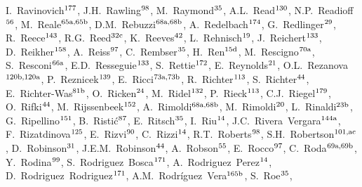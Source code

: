 \begin{flushleft}
I.~Ravinovich$^\textrm{\scriptsize 177}$,    
J.H.~Rawling$^\textrm{\scriptsize 98}$,    
M.~Raymond$^\textrm{\scriptsize 35}$,    
A.L.~Read$^\textrm{\scriptsize 130}$,    
N.P.~Readioff$^\textrm{\scriptsize 56}$,    
M.~Reale$^\textrm{\scriptsize 65a,65b}$,    
D.M.~Rebuzzi$^\textrm{\scriptsize 68a,68b}$,    
A.~Redelbach$^\textrm{\scriptsize 174}$,    
G.~Redlinger$^\textrm{\scriptsize 29}$,    
R.~Reece$^\textrm{\scriptsize 143}$,    
R.G.~Reed$^\textrm{\scriptsize 32c}$,    
K.~Reeves$^\textrm{\scriptsize 42}$,    
L.~Rehnisch$^\textrm{\scriptsize 19}$,    
J.~Reichert$^\textrm{\scriptsize 133}$,    
D.~Reikher$^\textrm{\scriptsize 158}$,    
A.~Reiss$^\textrm{\scriptsize 97}$,    
C.~Rembser$^\textrm{\scriptsize 35}$,    
H.~Ren$^\textrm{\scriptsize 15d}$,    
M.~Rescigno$^\textrm{\scriptsize 70a}$,    
S.~Resconi$^\textrm{\scriptsize 66a}$,    
E.D.~Resseguie$^\textrm{\scriptsize 133}$,    
S.~Rettie$^\textrm{\scriptsize 172}$,    
E.~Reynolds$^\textrm{\scriptsize 21}$,    
O.L.~Rezanova$^\textrm{\scriptsize 120b,120a}$,    
P.~Reznicek$^\textrm{\scriptsize 139}$,    
E.~Ricci$^\textrm{\scriptsize 73a,73b}$,    
R.~Richter$^\textrm{\scriptsize 113}$,    
S.~Richter$^\textrm{\scriptsize 44}$,    
E.~Richter-Was$^\textrm{\scriptsize 81b}$,    
O.~Ricken$^\textrm{\scriptsize 24}$,    
M.~Ridel$^\textrm{\scriptsize 132}$,    
P.~Rieck$^\textrm{\scriptsize 113}$,    
C.J.~Riegel$^\textrm{\scriptsize 179}$,    
O.~Rifki$^\textrm{\scriptsize 44}$,    
M.~Rijssenbeek$^\textrm{\scriptsize 152}$,    
A.~Rimoldi$^\textrm{\scriptsize 68a,68b}$,    
M.~Rimoldi$^\textrm{\scriptsize 20}$,    
L.~Rinaldi$^\textrm{\scriptsize 23b}$,    
G.~Ripellino$^\textrm{\scriptsize 151}$,    
B.~Risti\'{c}$^\textrm{\scriptsize 87}$,    
E.~Ritsch$^\textrm{\scriptsize 35}$,    
I.~Riu$^\textrm{\scriptsize 14}$,    
J.C.~Rivera~Vergara$^\textrm{\scriptsize 144a}$,    
F.~Rizatdinova$^\textrm{\scriptsize 125}$,    
E.~Rizvi$^\textrm{\scriptsize 90}$,    
C.~Rizzi$^\textrm{\scriptsize 14}$,    
R.T.~Roberts$^\textrm{\scriptsize 98}$,    
S.H.~Robertson$^\textrm{\scriptsize 101,ac}$,    
D.~Robinson$^\textrm{\scriptsize 31}$,    
J.E.M.~Robinson$^\textrm{\scriptsize 44}$,    
A.~Robson$^\textrm{\scriptsize 55}$,    
E.~Rocco$^\textrm{\scriptsize 97}$,    
C.~Roda$^\textrm{\scriptsize 69a,69b}$,    
Y.~Rodina$^\textrm{\scriptsize 99}$,    
S.~Rodriguez~Bosca$^\textrm{\scriptsize 171}$,    
A.~Rodriguez~Perez$^\textrm{\scriptsize 14}$,    
D.~Rodriguez~Rodriguez$^\textrm{\scriptsize 171}$,    
A.M.~Rodr\'iguez~Vera$^\textrm{\scriptsize 165b}$,    
S.~Roe$^\textrm{\scriptsize 35}$,    

\end{flushleft}
